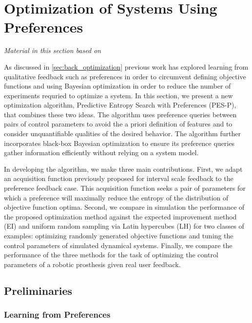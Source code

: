 \section{Optimization of Systems Using
Preferences}\label{sec:completed_pref_opt}

\emph{Material in this section based on
\citet{thatte2017sample}\cite{thatte2017sample}} 
\linebreak
 
As discussed in \cref{sec:back_optimization} previous work has explored learning
from qualitative feedback such as preferences in order to circumvent defining
objective functions and using Bayesian optimization in order to reduce the
number of experiments requried to optimize a system. In this section, we present
a new optimization algorithm, Predictive Entropy Search with Preferences
(PES-P), that combines these two ideas. The algorithm uses preference queries
between pairs of control parameters to avoid the a priori definition of features
and to consider unquantifiable qualities of the desired behavior. The algorithm
further incorporates black-box Bayesian optimization to ensure its preference
queries gather information efficiently without relying on a system model.

In developing the algorithm, we make three main contributions. First, we adapt
an acquisition function previously proposed for interval scale feedback to the
preference feedback case. This acquisition function seeks a pair of parameters
for which a preference will maximally reduce the entropy of the distribution of
objective function optima. Second, we compare in simulation the performance of
the proposed optimization method against the expected improvement method (EI)
and uniform random sampling via Latin hypercubes (LH) for two classes of
examples: optimizing randomly generated objective functions and tuning the
control parameters of simulated dynamical systems.  Finally, we compare the
performance of the three methods for the task of optimizing the control
parameters of a robotic prosthesis given real user feedback.

\subsection{Preliminaries} 
\subsubsection{Learning from Preferences}

